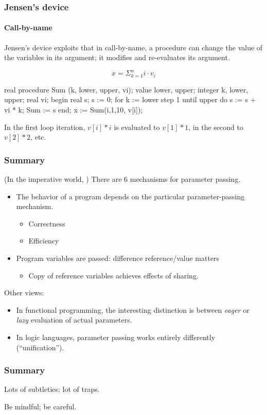\documentclass{beamer}
\begin{document}
\begin{frame}[fragile]
\frametitle{Jensen's device}
\framesubtitle{Call-by-name}
Jensen's device exploits that in call-by-name, a procedure can change the 
value of the variables in its argument; it modifies and re-evaluates
its argument. 

\[
    x = \Sigma_{k=1}^{n} i\cdot v_i
\]
\begin{cplus3}
real procedure Sum (k, lower, upper, vi); 
   value lower, upper;  
   integer k, lower, upper; real vi; 
begin 
   real s; 
   s := 0; 
   for k := lower step 1 until upper do 
      s := s + vi * k; 
   Sum := s 
end;
x := Sum(i,1,10, v[i]);
\end{cplus3}
In the first loop iteration, $v[i]*i$ is evaluated to
$v[1]*1$, in the second to $v[2]*2$, etc. 

\end{frame}


\begin{frame}
\frametitle{Summary}
(In the imperative world, ) 
There are  6 mechanisms for parameter passing. 
\begin{itemize}
\item The behavior of a program depends on the particular parameter-passing
mechanism.
\begin{itemize}
\item Correctness
\item Efficiency
\end{itemize}
\item Program variables are passed: difference reference/value matters
\begin{itemize}
\item Copy of reference variables achieves effects of sharing.
\end{itemize}

\end{itemize}

Other views:
\begin{itemize}
\item In functional programming, the interesting distinction is between
\textit{eager} or \textit{lazy} evaluation of actual parameters. 
\item In logic languages, parameter passing works entirely
differently (``unification'').
\end{itemize}

\end{frame}

\begin{frame}
\frametitle{Summary}

Lots of subtleties; lot of traps.

Be mindful; be careful.
\end{frame}
\end{document}
